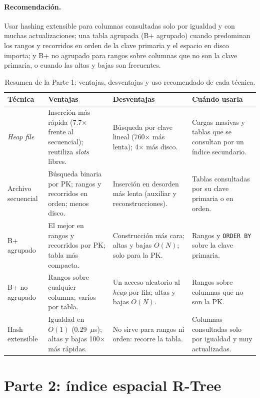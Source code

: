 \documentclass[11pt,a4paper]{article}
\begin{document}
\paragraph{Recomendación.} Usar hashing extensible para columnas consultadas solo por igualdad y con muchas actualizaciones; una tabla agrupada (B+ agrupado) cuando predominan los rangos y recorridos en orden de la clave primaria y el espacio en disco importa; y B+ no agrupado para rangos sobre columnas que no son la clave primaria, o cuando las altas y bajas son frecuentes.

\begin{table}[H]
  \centering
  \small
  \begin{tabular}{@{}p{2.4cm}p{4.4cm}p{4.4cm}p{4.0cm}@{}}
    \toprule
    \textbf{Técnica} & \textbf{Ventajas} & \textbf{Desventajas} & \textbf{Cuándo usarla} \\
    \midrule
    \emph{Heap file} & Inserción más rápida (7.7$\times$ frente al secuencial); reutiliza \emph{slots} libres. & Búsqueda por clave lineal (760$\times$ más lenta); 4$\times$ más disco. & Cargas masivas y tablas que se consultan por un índice secundario. \\
    Archivo secuencial & Búsqueda binaria por PK; rangos y recorridos en orden; menos disco. & Inserción en desorden más lenta (auxiliar y reconstrucciones). & Tablas consultadas por su clave primaria o en orden. \\
    \midrule
    B+ agrupado & El mejor en rangos y recorridos por PK; tabla más compacta. & Construcción más cara; altas y bajas $O(N)$; solo para la PK. & Rangos y \texttt{ORDER BY} sobre la clave primaria. \\
    B+ no agrupado & Rangos sobre cualquier columna; varios por tabla. & Un acceso aleatorio al \emph{heap} por fila; altas y bajas $O(N)$. & Rangos sobre columnas que no son la PK. \\
    Hash extensible & Igualdad en $O(1)$ (0.29~$\mu$s); altas y bajas 100$\times$ más rápidas. & No sirve para rangos ni orden: recorre la tabla. & Columnas consultadas solo por igualdad y muy actualizadas. \\
    \bottomrule
  \end{tabular}
  \caption{Resumen de la Parte 1: ventajas, desventajas y uso recomendado de cada técnica.}
  \label{tab:resumen-parte1}
\end{table}

\section{Parte 2: índice espacial R-Tree}
\end{document}
